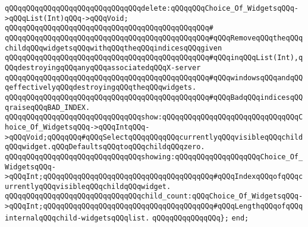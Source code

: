 \verb|qQQqqQQqqQQqqQQqqQQqqQQqqQQqqQQqdelete:qQQqqQQqChoice_Of_WidgetsqQQq->qQQqList(Int)qQQq->qQQqVoid;|\newline
\verb|qQQqqQQqqQQqqQQqqQQqqQQqqQQqqQQqqQQqqQQqqQQqqQQq#|\newline
\verb|qQQqqQQqqQQqqQQqqQQqqQQqqQQqqQQqqQQqqQQqqQQqqQQq#qQQqRemoveqQQqtheqQQqchildqQQqwidgetsqQQqwithqQQqtheqQQqindicesqQQqgiven|\newline
\verb|qQQqqQQqqQQqqQQqqQQqqQQqqQQqqQQqqQQqqQQqqQQqqQQq#qQQqinqQQqList(Int),qQQqdestroyingqQQqanyqQQqassociatedqQQqX-server|\newline
\verb|qQQqqQQqqQQqqQQqqQQqqQQqqQQqqQQqqQQqqQQqqQQqqQQq#qQQqwindowsqQQqandqQQqeffectivelyqQQqdestroyingqQQqtheqQQqwidgets.|\newline
\verb|qQQqqQQqqQQqqQQqqQQqqQQqqQQqqQQqqQQqqQQqqQQqqQQq#qQQqBadqQQqindicesqQQqraiseqQQqBAD_INDEX.|\newline
\newline
\verb|qQQqqQQqqQQqqQQqqQQqqQQqqQQqqQQqshow:qQQqqQQqqQQqqQQqqQQqqQQqqQQqqQQqChoice_Of_WidgetsqQQq->qQQqIntqQQq->qQQqVoid;qQQqqQQq#qQQqSelectqQQqqQQqqQQqcurrentlyqQQqvisibleqQQqchildqQQqwidget.qQQqDefaultsqQQqtoqQQqchildqQQqzero.|\newline
\verb|qQQqqQQqqQQqqQQqqQQqqQQqqQQqqQQqshowing:qQQqqQQqqQQqqQQqqQQqChoice_Of_WidgetsqQQq->qQQqInt;qQQqqQQqqQQqqQQqqQQqqQQqqQQqqQQqqQQqqQQq#qQQqIndexqQQqofqQQqcurrentlyqQQqvisibleqQQqchildqQQqwidget.|\newline
\verb|qQQqqQQqqQQqqQQqqQQqqQQqqQQqqQQqchild_count:qQQqChoice_Of_WidgetsqQQq->qQQqInt;qQQqqQQqqQQqqQQqqQQqqQQqqQQqqQQqqQQqqQQq#qQQqLengthqQQqofqQQqinternalqQQqchild-widgetsqQQqlist.|\newline
\verb|qQQqqQQqqQQqqQQq};|\newline
\newline
\verb|end;|\newline
\newline
\newline

